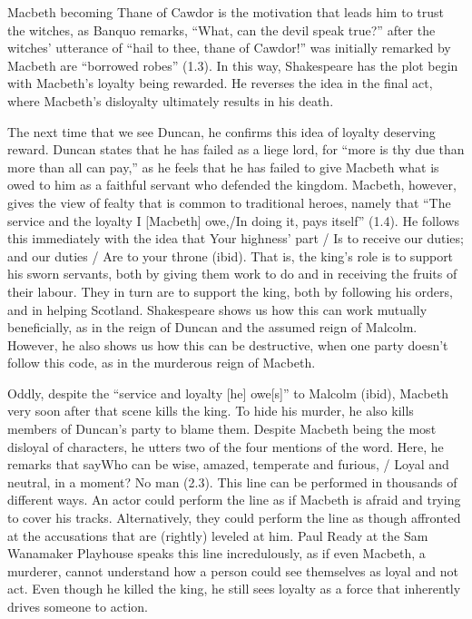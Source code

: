 \documentclass[12pt]{article}[titlepage]
\newcommand{\say}[1]{``#1''}
\newcommand{\1}{\={a}}
\newcommand{\2}{\={e}}
\newcommand{\3}{\={\i}}
\newcommand{\4}{\=o}
\newcommand{\5}{\=u}
\newcommand{\6}{\={A}}
\renewcommand{\,}{\textsuperscript{,}}
\begin{document}
Macbeth becoming Thane of Cawdor is the motivation that leads him to trust the witches, as Banquo remarks, \say{What, can the devil speak true?} after the witches' utterance of \say{hail to thee, thane of Cawdor!} was initially remarked by Macbeth are \say{borrowed robes} (1.3).
In this way, Shakespeare has the plot begin with Macbeth's loyalty being rewarded.
He reverses the idea in the final act, where Macbeth's disloyalty ultimately results in his death. 

The next time that we see Duncan, he confirms this idea of loyalty deserving reward.
Duncan states that he has failed as a liege lord, for \say{more is thy due than more than all can pay,} as he feels that he has failed to give Macbeth what is owed to him as a faithful servant who defended the kingdom.
Macbeth, however, gives the view of fealty that is common to traditional heroes, namely that \say{The service and the loyalty I [Macbeth] owe,/In doing it, pays itself} (1.4).
He follows this immediately with the idea that {Your highness' part / Is to receive our duties; and our duties / Are to your throne} (ibid).
That is, the king's role is to support his sworn servants, both by giving them work to do and in receiving the fruits of their labour.
They in turn are to support the king, both by following his orders, and in helping Scotland.
Shakespeare shows us how this can work mutually beneficially, as in the reign of Duncan and the assumed reign of Malcolm.
However, he also shows us how this can be destructive, when one party doesn't follow this code, as in the murderous reign of Macbeth.

Oddly, despite the \say{service and loyalty [he] owe[s]} to Malcolm (ibid), Macbeth very soon after that scene kills the king.
To hide his murder, he also kills members of Duncan's party to blame them.
Despite Macbeth being the most disloyal of characters, he utters two of the four mentions of the word.
Here, he remarks that say{Who can be wise, amazed, temperate and furious, / Loyal and neutral, in a moment? No man} (2.3).
This line can be performed in thousands of different ways.
An actor could perform the line as if Macbeth is afraid and trying to cover his tracks.
Alternatively, they could perform the line as though affronted at the accusations that are (rightly) leveled at him.
Paul Ready at the Sam Wanamaker Playhouse speaks this line incredulously, as if even Macbeth, a murderer, cannot understand how a person could see themselves as loyal and not act.
Even though he killed the king, he still sees loyalty as a force that inherently drives someone to action.
\end{document}
